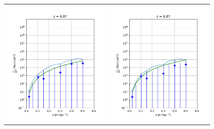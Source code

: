 \begin{figure}
\begin{tabular}{ll}
\includegraphics[scale=0.5]{chapters/psa128_pol/figures/pIn_I.pdf} &
\includegraphics[scale=0.5]{chapters/psa128_pol/figures/pIn_Q.pdf} \\

\end{tabular}
\end{figure}
